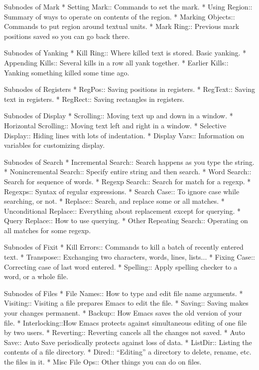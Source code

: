 Subnodes of Mark
* Setting Mark::       Commands to set the mark.
* Using Region::       Summary of ways to operate on contents of the region.
* Marking Objects::    Commands to put region around textual units.
* Mark Ring::          Previous mark positions saved so you can go back there.

Subnodes of Yanking
* Kill Ring::          Where killed text is stored.  Basic yanking.
* Appending Kills::    Several kills in a row all yank together.
* Earlier Kills::      Yanking something killed some time ago.

Subnodes of Registers
* RegPos::             Saving positions in registers.
* RegText::            Saving text in registers.
* RegRect::            Saving rectangles in registers.

Subnodes of Display
* Scrolling::	           Moving text up and down in a window.
* Horizontal Scrolling::   Moving text left and right in a window.
* Selective Display::      Hiding lines with lots of indentation.
* Display Vars::           Information on variables for customizing display.

Subnodes of Search
* Incremental Search::     Search happens as you type the string.
* Nonincremental Search::  Specify entire string and then search.
* Word Search:: 	   Search for sequence of words.
* Regexp Search::	   Search for match for a regexp.
* Regexps::     	   Syntax of regular expressions.
* Search Case::		   To ignore case while searching, or not.
* Replace::     	   Search, and replace some or all matches.
* Unconditional Replace::  Everything about replacement except for querying.
* Query Replace::          How to use querying.
* Other Repeating Search:: Operating on all matches for some regexp.

Subnodes of Fixit
* Kill Errors:: Commands to kill a batch of recently entered text.
* Transpose::   Exchanging two characters, words, lines, lists...
* Fixing Case:: Correcting case of last word entered.
* Spelling::    Apply spelling checker to a word, or a whole file.

Subnodes of Files
* File Names::  How to type and edit file name arguments.
* Visiting::    Visiting a file prepares Emacs to edit the file.
* Saving::      Saving makes your changes permanent.
* Backup::      How Emacs saves the old version of your file.
* Interlocking::How Emacs protects against simultaneous editing
                 of one file by two users.
* Reverting::   Reverting cancels all the changes not saved.
* Auto Save::   Auto Save periodically protects against loss of data.
* ListDir::     Listing the contents of a file directory.
* Dired::       ``Editing'' a directory to delete, rename, etc.
                 the files in it.
* Misc File Ops:: Other things you can do on files.

